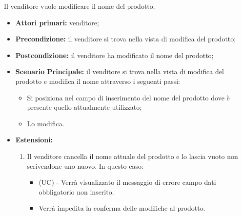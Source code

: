 \resetSubUC
{}
Il venditore vuole modificare il nome del prodotto.
\begin{itemize}
    \item \textbf{Attori primari:} venditore;
    \item \textbf{Precondizione:} il venditore si trova nella vista di modifica del prodotto;
    \item \textbf{Postcondizione:} il venditore ha modificato il nome del prodotto;
    \item \textbf{Scenario Principale:} il venditore si trova nella vista di modifica del prodotto e modifica il nome attraverso i seguenti passi:
    \begin{itemize}
        \item Si posiziona nel campo di inserimento del nome del prodotto dove è presente quello attualmente utilizzato;
        \item Lo modifica.
    \end{itemize}
    \item \textbf{Estensioni:}
    \begin{enumerate}
    	\item Il venditore cancella il nome attuale del prodotto e lo lascia vuoto non scrivendone uno nuovo. In questo caso:
    	\begin{itemize}
    		\item (UC) - Verrà visualizzato il messaggio di errore campo dati obbligatorio non inserito.
    		\item Verrà impedita la conferma delle modifiche al prodotto.
    	\end{itemize}
    \end{enumerate}
\end{itemize}

